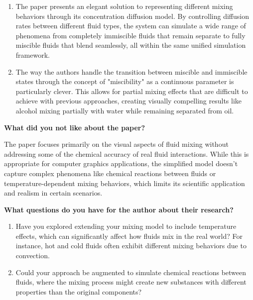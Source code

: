 \documentclass[
]{article}
\begin{document}
\begin{enumerate}
\def\labelenumi{\arabic{enumi}.}
\item
  The paper presents an elegant solution to representing different mixing behaviors through its concentration diffusion model. By controlling diffusion rates between different fluid types, the system can simulate a wide range of phenomena from completely immiscible fluids that remain separate to fully miscible fluids that blend seamlessly, all within the same unified simulation framework.
\item
  The way the authors handle the transition between miscible and immiscible states through the concept of "miscibility" as a continuous parameter is particularly clever. This allows for partial mixing effects that are difficult to achieve with previous approaches, creating visually compelling results like alcohol mixing partially with water while remaining separated from oil.
\end{enumerate}

\textbf{What did you not like about the paper?}

The paper focuses primarily on the visual aspects of fluid mixing without addressing some of the chemical accuracy of real fluid interactions. While this is appropriate for computer graphics applications, the simplified model doesn't capture complex phenomena like chemical reactions between fluids or temperature-dependent mixing behaviors, which limits its scientific application and realism in certain scenarios.

\textbf{What questions do you have for the author about their research?}

\begin{enumerate}
\def\labelenumi{\arabic{enumi}.}
\item
  Have you explored extending your mixing model to include temperature effects, which can significantly affect how fluids mix in the real world? For instance, hot and cold fluids often exhibit different mixing behaviors due to convection.
\item
  Could your approach be augmented to simulate chemical reactions between fluids, where the mixing process might create new substances with different properties than the original components?
\end{enumerate}
\end{document}
